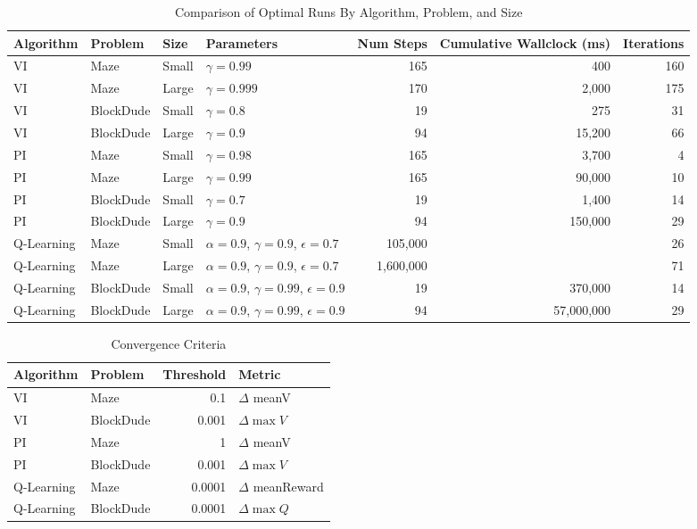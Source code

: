 \documentclass{article}
\begin{document}
\begin{table}
    \centering
    \caption{Comparison of Optimal Runs By Algorithm, Problem, and Size}
    \label{table:comparison}
    \begin{tabular}{llllrrr}
        \toprule
        Algorithm & Problem &  Size &  Parameters & Num Steps & Cumulative Wallclock (ms) & Iterations \\
        \midrule
        VI & Maze & Small & $\gamma = 0.99$ & 165 & 400 & 160 \\
        VI & Maze & Large & $\gamma = 0.999$ & 170 & 2,000 & 175 \\
        VI & BlockDude & Small & $\gamma = 0.8$ & 19 & 275 & 31 \\
        VI & BlockDude & Large & $\gamma = 0.9$ & 94 & 15,200 & 66 \\
        \midrule
        PI & Maze & Small & $\gamma = 0.98$ & 165 & 3,700 & 4 \\
        PI & Maze & Large & $\gamma = 0.99$ & 165 & 90,000 & 10 \\
        PI & BlockDude & Small & $\gamma = 0.7$ & 19 & 1,400 & 14 \\
        PI & BlockDude & Large & $\gamma = 0.9$ & 94 & 150,000 & 29 \\
        \midrule
        Q-Learning & Maze & Small & $\alpha = 0.9$, $\gamma = 0.9$, $\epsilon = 0.7$ & 105,000 &  & 26 \\
        Q-Learning & Maze & Large & $\alpha = 0.9$, $\gamma = 0.9$, $\epsilon = 0.7$ & 1,600,000 &  & 71 \\
        Q-Learning & BlockDude & Small & $\alpha = 0.9$, $\gamma = 0.99$, $\epsilon = 0.9$ & 19 & 370,000 & 14 \\
        Q-Learning & BlockDude & Large & $\alpha = 0.9$, $\gamma = 0.99$, $\epsilon = 0.9$ & 94 & 57,000,000 & 29 \\
        \bottomrule
        \end{tabular}
    \end{table}

    \begin{table}
        \centering
        \caption{Convergence Criteria}
        \label{table:convergence}
        \begin{tabular}{llrl}
            \toprule
            Algorithm & Problem &  Threshold & Metric \\
            \midrule
            VI & Maze & 0.1 & $\Delta$ meanV \\
            VI & BlockDude & 0.001 & $\Delta \max{V}$ \\
            PI & Maze & 1 & $\Delta$ meanV \\
            PI & BlockDude & 0.001 & $\Delta \max{V}$ \\
            Q-Learning & Maze & 0.0001 & $\Delta$ meanReward \\
            Q-Learning & BlockDude & 0.0001 & $\Delta \max{Q}$ \\
            \bottomrule
            \end{tabular}
        \end{table}
    



    {}

\end{document}
